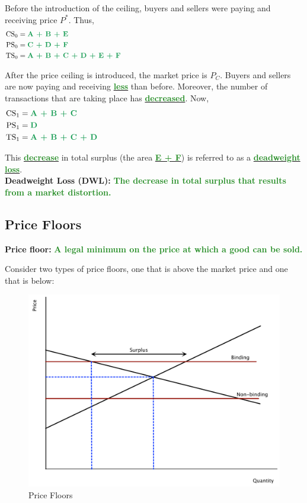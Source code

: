 \documentclass[11pt]{article}\usepackage[]{graphicx}\usepackage[]{color}
\theoremstyle{definition}
\newcommand{\ddp}[1]{{\textbf{\textcolor{ForestGreen}{#1}}}}
\newcommand{\dd}[1]{{\underline{\textbf{\textcolor{ForestGreen}{#1}}}}}
\newcommand{\defn}[1]{\textbf{#1}}
\begin{document}
	
	
	Before the introduction of the ceiling, buyers and sellers were paying and receiving price $P^*$. Thus, 
	\begin{align*}
	\text{CS}_0 &= \ddp{A + B + E}\\
	\text{PS}_0 &= \ddp{C + D + F}\\
	\text{TS}_0 &= \ddp{A + B + C + D + E + F}
	\phantom{\hspace{9cm}}
	\end{align*}
	
	After the price ceiling is introduced, the market price is $P_C$. Buyers and sellers are now paying and receiving \dd{less} than before. Moreover, the number of transactions that are taking place has \dd{decreased}. Now, 
	\begin{align*}
	\text{CS}_1 &= \ddp{A + B + C}\\
	\text{PS}_1 &= \ddp{D}\\
	\text{TS}_1 &= \ddp{A + B + C + D}
	\phantom{\hspace{9cm}}
	\end{align*}
	
	
	This \dd{decrease} in total surplus (the area \dd{E + F}) is referred to as a \dd{deadweight loss}.
	\\
	
	\defn{Deadweight Loss (DWL):} \ddp{The decrease in total surplus that results from a market distortion.}
	
	\subsection{Price Floors}
	
	\defn{Price floor:} \ddp{A legal minimum on the price at which a good can be sold.\\}
	
	Consider two types of price floors, one that is above the market price and one that is below:
	
		\begin{figure}[H]
			\centering
			\includegraphics[scale=.40]{plot35.pdf}
			\caption{Price Floors}
		\end{figure}
		
\end{document}
